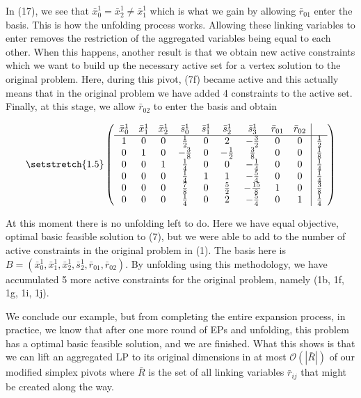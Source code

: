 \documentclass[11pt]{article} %
\begin{document}
	In (17), we see that $\bar{x}_0^1 = \bar{x}_2^1 \neq \bar{x}_1^1$ which is what we gain by allowing $\bar{r}_{01}$ enter the basis.  This is how the unfolding process works.  Allowing these linking variables to enter removes the restriction of the aggregated variables being equal to each other.  When this happens, another result is that we obtain new active constraints which we want to build up the necessary active set for a vertex solution to the original problem.  Here, during this pivot, (7f) became active and this actually means that in the original problem we have added 4 constraints to the active set.  Finally, at this stage, we allow $\bar{r}_{02}$ to enter the basis and obtain

	\begin{equation}\setstretch{1.5}
	\begin{pmatrix}
		\begin{array}{ccccccccc|c}
			\bar{x}^1_0 & \bar{x}^1_1 & \bar{x}^1_2 & \bar{s}^1_0 & \bar{s}^1_1 & \bar{s}^1_2 & \bar{s}^1_3 & \bar{r}_{01} & \bar{r}_{02} \\
			\hline
			1 & 0 & 0 & \frac{1}{2} & 0 & 2 & -\frac{3}{2} & 0 & 0 & \frac{1}{2} \\ 
			0 & 1 & 0 & -\frac{3}{8} & 0 & -\frac{1}{2} & \frac{3}{8} &  0 & 0 & \frac{1}{8} \\ 
			0 & 0 & 1 & \frac{1}{4} & 0 & 0 & -\frac{1}{4} & 0 & 0 & \frac{1}{4} \\ 
			0 & 0 & 0 & \frac{1}{4} & 1 & 1 & -\frac{5}{4} & 0 & 0 & \frac{1}{4} \\ 
			0 & 0 & 0 & \frac{7}{8} & 0 & \frac{5}{2} & -\frac{15}{8} & 1 & 0 & \frac{3}{8} \\
			0 & 0 & 0 & \frac{1}{4} & 0 & 2 & -\frac{5}{4} & 0 & 1 & \frac{1}{4} \\
		\end{array}
	\end{pmatrix}
\end{equation}

At this moment there is no unfolding left to do.  Here we have equal objective, optimal basic feasible solution to (7), but we were able to add to the number of active constraints in the original problem in (1).  The basis here is $B = (\bar{x}_0^1, \bar{x}_1^1, \bar{x}_2^1, \bar{s}_2^1, \bar{r}_{01}, \bar{r}_{02})$.  By unfolding using this methodology, we have accumulated 5 more active constraints for the original problem, namely (1b, 1f, 1g, 1i, 1j).

We conclude our example, but from completing the entire expansion process, in practice, we know that after one more round of EPs and unfolding, this problem has a optimal basic feasible solution, and we are finished.  What this shows is that we can lift an aggregated LP to its original dimensions in at most $\mathcal{O}(|\bar{R}|)$ of our modified simplex pivots where $\bar{R}$ is the set of all linking variables $\bar{r}_{ij}$ that might be created along the way.
 
\end{document}
